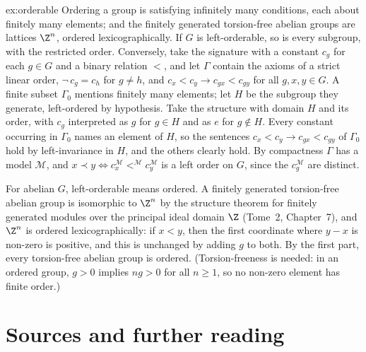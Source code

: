 \begin{solution}{ex:orderable}
\idea Ordering a group is satisfying infinitely many conditions, each about finitely many elements; and the finitely generated torsion-free abelian groups are lattices $\Z^n$, ordered lexicographically.
\writeup If $G$ is left-orderable, so is every subgroup, with the restricted order. Conversely, take the signature with a constant $c_g$ for each $g\in G$ and a binary relation $<$, and let $\Gamma$ contain the axioms of a strict linear order, $\neg\,c_g=c_h$ for $g\ne h$, and $c_x<c_y\to c_{gx}<c_{gy}$ for all $g,x,y\in G$. A finite subset $\Gamma_0$ mentions finitely many elements; let $H$ be the subgroup they generate, left-ordered by hypothesis. Take the structure with domain $H$ and its order, with $c_g$ interpreted as $g$ for $g\in H$ and as $e$ for $g\notin H$. Every constant occurring in $\Gamma_0$ names an element of $H$, so the sentences $c_x<c_y\to c_{gx}<c_{gy}$ of $\Gamma_0$ hold by left-invariance in $H$, and the others clearly hold. By compactness $\Gamma$ has a model $\mathcal M$, and $x\prec y\iff c_x^{\mathcal M}<^{\mathcal M}c_y^{\mathcal M}$ is a left order on $G$, since the $c_g^{\mathcal M}$ are distinct.

For abelian $G$, left-orderable means ordered. A finitely generated torsion-free abelian group is isomorphic to $\Z^n$ by the structure theorem for finitely generated modules over the principal ideal domain $\Z$ (Tome~2, Chapter~7), and $\Z^n$ is ordered lexicographically: if $x<y$, then the first coordinate where $y-x$ is non-zero is positive, and this is unchanged by adding $g$ to both. By the first part, every torsion-free abelian group is ordered. (Torsion-freeness is needed: in an ordered group, $g>0$ implies $ng>0$ for all $n\ge1$, so no non-zero element has finite order.)
\end{solution}

\section*{Sources and further reading}

